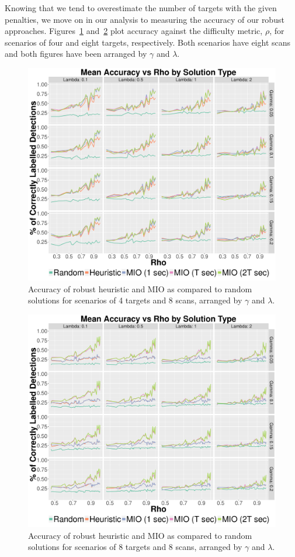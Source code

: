 Knowing that we tend to overestimate the number of targets with the given penalties, we move on in our analysis to measuring the accuracy of our robust approaches. Figures~\ref{fig:Robust_4_8_Accuracy} and~\ref{fig:Robust_8_8_Accuracy} plot accuracy against the difficulty metric, $\rho$, for scenarios of four and eight targets, respectively. Both scenarios have eight scans and both figures have been arranged by $\gamma$ and $\lambda$.
\begin{figure}[ht]
  \centering
  \includegraphics[width=\columnwidth]{../Figures/4_8_Accuracy}
  \caption{Accuracy of robust heuristic and MIO as compared to random solutions for scenarios of 4 targets and 8 scans, arranged by $\gamma$ and $\lambda$.}
  \label{fig:Robust_4_8_Accuracy}
\end{figure}
\begin{figure}[ht]
  \centering
  \includegraphics[width=\columnwidth]{../Figures/8_8_Accuracy}
  \caption{Accuracy of robust heuristic and MIO as compared to random solutions for scenarios of 8 targets and 8 scans, arranged by $\gamma$ and $\lambda$.}
  \label{fig:Robust_8_8_Accuracy}
\end{figure}

